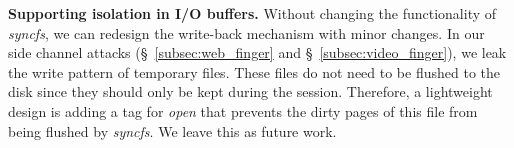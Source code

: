 



\textbf{Supporting isolation in I/O buffers.} Without changing the functionality of \textit{syncfs}, we can redesign the write-back mechanism with minor changes. In our side channel attacks (§~\ref{subsec:web_finger} and §~\ref{subsec:video_finger}), we leak the write pattern of temporary files. These files do not need to be flushed to the disk since they should only be kept during the session. Therefore, a lightweight design is adding a tag for \textit{open} that prevents the dirty pages of this file from being flushed by \textit{syncfs}. We leave this as future work.
